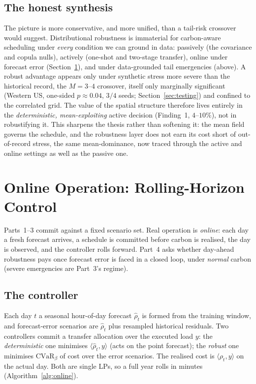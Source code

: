 \documentclass[12pt]{article}
\newcommand{\CVaR}{\mathrm{CVaR}}
\begin{document}
\subsection{The honest synthesis}
The picture is more conservative, and more unified, than a tail-risk crossover would
suggest. Distributional robustness is immaterial for carbon-aware scheduling under
\emph{every} condition we can ground in data: passively (the covariance and copula
nulls), actively (one-shot and two-stage transfer), online under forecast error
(Section~\ref{sec:online}), and under data-grounded tail emergencies (above). A robust
advantage appears only under synthetic stress more severe than the historical record,
the $M=3$--$4$ crossover, itself only marginally significant (Western US, one-sided
$p\approx0.04$, $3/4$ seeds; Section~\ref{sec:testing}) and confined to the correlated
grid. The value of the spatial structure therefore lives entirely in the
\emph{deterministic, mean-exploiting} active decision (Finding~1, $4$--$10\%$), not in
robustifying it. This sharpens the thesis rather than softening it: the mean field
governs the schedule, and the robustness layer does not earn its cost short of
out-of-record stress, the same mean-dominance, now traced through the active and online
settings as well as the passive one.

\section{Online Operation: Rolling-Horizon Control}\label{sec:online}
Parts~1--3 commit against a fixed scenario set. Real operation is \emph{online}: each
day a fresh forecast arrives, a schedule is committed before carbon is realised, the
day is observed, and the controller rolls forward. Part~4 asks whether day-ahead
robustness pays once forecast error is faced in a closed loop, under \emph{normal}
carbon (severe emergencies are Part~3's regime).

\subsection{The controller}
Each day $t$ a seasonal hour-of-day forecast $\hat\rho_t$ is formed from the training
window, and forecast-error scenarios are $\hat\rho_t$ plus resampled historical
residuals. Two controllers commit a transfer allocation over the executed load $y$:
the \emph{deterministic} one minimises $\langle\hat\rho_t,y\rangle$ (acts on the point
forecast); the \emph{robust} one minimises $\CVaR_\beta$ of cost over the error
scenarios. The realised cost is $\langle\rho_t,y\rangle$ on the actual day. Both are
single LPs, so a full year rolls in minutes (Algorithm~\ref{alg:online}).
\end{document}
